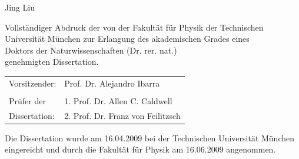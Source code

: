 \begin{titlepage}
\Large Jing Liu

\vspace{2. cm}

\normalsize Vollst\"andiger Abdruck der von der Fakult\"at f\"ur
Physik der Technischen Universit\"at M\"unchen zur Erlangung des
akademischen Grades eines \\
Doktors der Naturwissenschaften (Dr. rer. nat.) \\
genehmigten Dissertation. \\

\vspace{1.5 cm} 

\begin{table}[h]
  \centering
  \begin{tabular}{ll}
    Vorsitzender: & Prof. Dr. Alejandro Ibarra\\ 
    & \\ 
    Pr\"ufer der & 1. Prof. Dr. Allen C. Caldwell\\ 
    Dissertation: & 2. Prof. Dr. Franz von Feilitzsch \\ 
  \end{tabular}
\end{table}

\vspace{2.0 cm} 

Die Dissertation wurde am 16.04.2009 bei der Technischen Universit\"at
M\"unchen eingereicht und durch die Fakult\"at f\"ur Physik am
16.06.2009 angenommen. \\

\end{titlepage} 

\cleardoublepage

